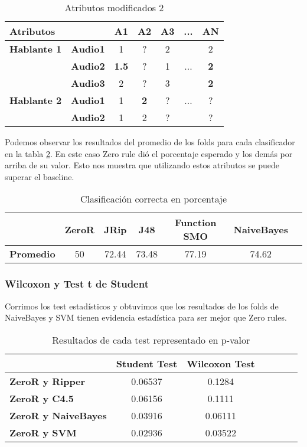 \begin{table}[H]
	\centering
	\begin{tabular}{|l|l|ccccc|}
		\hline
		\multicolumn{2}{|l|}{Atributos} & A1 & A2 & A3 & ... & AN \\
		\hline 
		\textbf{Hablante 1} & \textbf{Audio1} & 1 & ? & 2 & & 2\\
		& \textbf{Audio2} & \textbf{1.5} & ? & 1 & ... & \textbf{2} \\
		& \textbf{Audio3} & 2 & ? & 3 & & \textbf{2} \\
		\hline
		\textbf{Hablante 2} & \textbf{Audio1} & 1 & \textbf{2} & ? & ... & ? \\
		& \textbf{Audio2} & 1 & 2 & ? & & ? \\
		\hline
	\end{tabular}
	\caption{Atributos modificados 2}
	\label{attr_mod}
\end{table}

Podemos observar los resultados del promedio de los folds para cada clasificador en la tabla \ref{class_corr_en_pct}. En este caso Zero rule dió el porcentaje esperado y los demás por arriba de su valor. Esto nos muestra que utilizando estos atributos se puede superar el baseline.

\begin{table}[H]
	\centering
	\begin{tabular}{|l|c|c|c|c|c|c|}
		\hline
		\textbf{}  & \textbf{ZeroR} & \textbf{JRip} & \textbf{J48} & \textbf{Function SMO} & \textbf{NaiveBayes} \\ \hline
		\textbf{Promedio} & 50 & 72.44 & 73.48 & 77.19 & 74.62 \\ \hline
	\end{tabular}
	\caption{Clasificación correcta en porcentaje}
	\label{class_corr_en_pct}
\end{table}

\subsubsection{Wilcoxon y Test t de Student}

Corrimos los test estadísticos y obtuvimos que los resultados de los folds de NaiveBayes y SVM tienen evidencia estadística para ser mejor que Zero rules. 

\begin{table}[H]
	\centering
	\begin{tabular}{|l|c|c|c|c|c|c|}
		\hline
		\textbf{}  & \textbf{Student Test} & \textbf{Wilcoxon Test} \\ \hline
		\textbf{ZeroR y Ripper}  & 0.06537 & 0.1284 \\ \hline
		\textbf{ZeroR y C4.5}  & 0.06156 &  0.1111 \\ \hline
		\textbf{ZeroR y NaiveBayes}  & 0.03916 & 0.06111 \\ \hline
		\textbf{ZeroR y SVM}  &  0.02936 & 0.03522 \\ \hline
	\end{tabular}
	\caption{Resultados de cada test representado en p-valor}
	\label{res_tests_wilcoxon_student}
\end{table}

